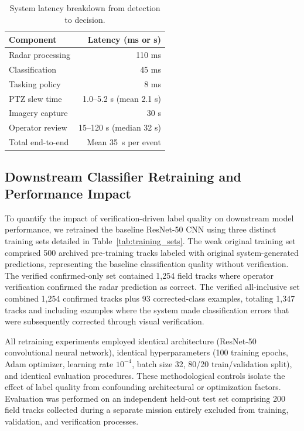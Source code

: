 \documentclass[conf]{asmeconf}
\begin{document}
\begin{table}[t]
\caption{System latency breakdown from detection to decision.}
\label{tab:latency}
\centering
\begin{tabular}{@{}lr@{}}
\toprule
Component & Latency (ms or s) \\
\midrule
Radar processing & 110 ms \\
Classification & 45 ms \\
Tasking policy & 8 ms \\
PTZ slew time & 1.0--5.2 s (mean 2.1 s) \\
Imagery capture & 30 s \\
Operator review & 15--120 s (median 32 s) \\
\midrule
Total end-to-end & Mean \SI{35}{s} per event \\
\bottomrule
\end{tabular}
\end{table}

\subsection{Downstream Classifier Retraining and Performance Impact}

To quantify the impact of verification-driven label quality on downstream model performance, we retrained the baseline ResNet-50 CNN using three distinct training sets detailed in Table~\ref{tab:training_sets}. The weak original training set comprised 500 archived pre-training tracks labeled with original system-generated predictions, representing the baseline classification quality without verification. The verified confirmed-only set contained 1,254 field tracks where operator verification confirmed the radar prediction as correct. The verified all-inclusive set combined 1,254 confirmed tracks plus 93 corrected-class examples, totaling 1,347 tracks and including examples where the system made classification errors that were subsequently corrected through visual verification.

All retraining experiments employed identical architecture (ResNet-50 convolutional neural network), identical hyperparameters (100 training epochs, Adam optimizer, learning rate $10^{-4}$, batch size 32, 80/20 train/validation split), and identical evaluation procedures. These methodological controls isolate the effect of label quality from confounding architectural or optimization factors. Evaluation was performed on an independent held-out test set comprising 200 field tracks collected during a separate mission entirely excluded from training, validation, and verification processes.
\end{document}
